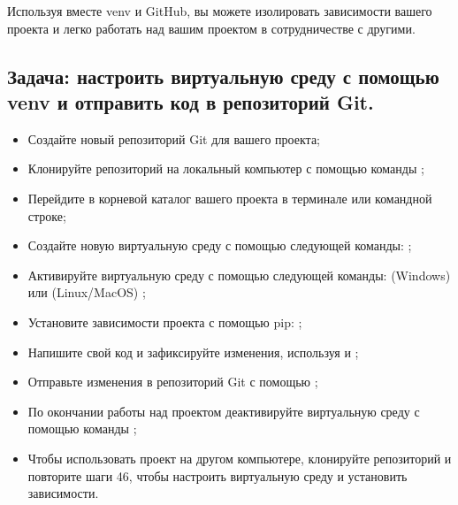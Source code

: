 \documentclass[letterpaper,10pt,russian]{sphinxmanual}
\begin{document}
\sphinxAtStartPar
Используя вместе venv и GitHub, вы можете изолировать зависимости вашего проекта и легко работать над вашим проектом в сотрудничестве с другими.


\subsection{Задача: настроить виртуальную среду с помощью venv и отправить код в репозиторий Git.}
\label{\detokenize{educational_materials/path_venv/exercises:venv-git}}\begin{itemize}
\item {} 
\sphinxAtStartPar
Создайте новый репозиторий Git для вашего проекта;

\item {} 
\sphinxAtStartPar
Клонируйте репозиторий на локальный компьютер с помощью команды ;

\item {} 
\sphinxAtStartPar
Перейдите в корневой каталог вашего проекта в терминале или командной строке;

\item {} 
\sphinxAtStartPar
Создайте новую виртуальную среду с помощью следующей команды: ;

\item {} 
\sphinxAtStartPar
Активируйте виртуальную среду с помощью следующей команды: (Windows)  или (Linux/MacOS) ;

\item {} 
\sphinxAtStartPar
Установите зависимости проекта с помощью pip: ;

\item {} 
\sphinxAtStartPar
Напишите свой код и зафиксируйте изменения, используя  и ;

\item {} 
\sphinxAtStartPar
Отправьте изменения в репозиторий Git с помощью ;

\item {} 
\sphinxAtStartPar
По окончании работы над проектом деактивируйте виртуальную среду с помощью команды ;

\item {} 
\sphinxAtStartPar
Чтобы использовать проект на другом компьютере, клонируйте репозиторий и повторите шаги 4\textendash{}6, чтобы настроить виртуальную среду и установить зависимости.

\end{itemize}
\end{document}
